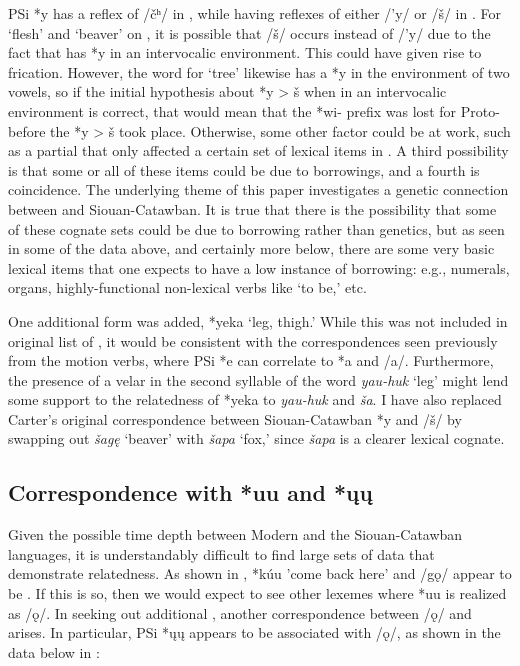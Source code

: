 \documentclass[output=paper]{LSP/langsci}
\begin{document}
PSi *y has a reflex of /\v{c}ʰ/ in , while having reflexes of either /'y/ or /\v{s}/ in . For `flesh' and `beaver' on , it is possible that  /\v{s}/ occurs instead of /'y/ due to the fact that  has *y in an intervocalic environment. This could have given rise to frication. However, the word for `tree' likewise has a *y in the environment of two vowels, so if the initial hypothesis about *y > \v{s} when in an intervocalic environment is correct, that would mean that the *wi- prefix was lost for Proto- before the *y > \v{s}  took place. Otherwise, some other factor could be at work, such as a partial  that only affected a certain set of lexical items in . A third possibility is that some or all of these items could be due to borrowings, and a fourth is coincidence. The underlying theme of this paper investigates a genetic connection between  and Siouan-Catawban. It is true that there is the possibility that some of these cognate sets could be due to borrowing rather than genetics, but as seen in some of the data above, and certainly more below, there are some very basic lexical items that one expects to have a low instance of borrowing: e.g., numerals, organs, highly-functional non-lexical verbs like `to be,' etc. 

One additional  form was added, *yeka `leg, thigh.' While this was not included in  original list of , it would be consistent with the correspondences seen previously from the motion verbs, where PSi *e can correlate to  *a and  /a/. Furthermore, the presence of a velar in the second syllable of the  word \emph{yau-huk} `leg' might lend some support to the relatedness of *yeka to  \emph{yau-huk} and  \emph{\v{s}a}. I have also replaced Carter's original correspondence between Siouan-Catawban *y and  /\v{s}/ by swapping out \emph{\v{s}ag\k{e}} `beaver' with \emph{\v{s}apa} `fox,' since \emph{\v{s}apa} is a clearer lexical cognate.

\subsection{Correspondence with  *uu and *\k{u}\k{u}}

Given the possible time depth between Modern  and the Siouan-Catawban languages, it is understandably difficult to find large sets of data that demonstrate relatedness. As shown in , *k\'uu 'come back here' and  /g\k{o}/ appear to be . If this is so, then we would expect to see other lexemes where *uu is realized as /\k{o}/. In seeking out additional , another correspondence between  /\k{o}/ and  arises. In particular, PSi *\k{u}\k{u} appears to be associated with /\k{o}/, as shown in the data below in :
\end{document}
